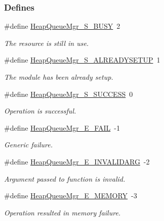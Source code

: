\subsubsection*{Defines}
\begin{DoxyCompactItemize}
\item 
\#define \hyperlink{_heap_queue_mgr_8h_a8c8548b774b12881b04ad5605794fe74}{HeapQueueMgr\_\-S\_\-BUSY}~2
\begin{DoxyCompactList}\small\item\em The resource is still in use. \item\end{DoxyCompactList}\item 
\#define \hyperlink{_heap_queue_mgr_8h_aa426084287fd3ff6fdbf269c462c1f67}{HeapQueueMgr\_\-S\_\-ALREADYSETUP}~1
\begin{DoxyCompactList}\small\item\em The module has been already setup. \item\end{DoxyCompactList}\item 
\#define \hyperlink{_heap_queue_mgr_8h_ae391285fa01b20f0bafde23b9f35e86b}{HeapQueueMgr\_\-S\_\-SUCCESS}~0
\begin{DoxyCompactList}\small\item\em Operation is successful. \item\end{DoxyCompactList}\item 
\#define \hyperlink{_heap_queue_mgr_8h_a6f142c013f3391abb45f411629099c33}{HeapQueueMgr\_\-E\_\-FAIL}~-\/1
\begin{DoxyCompactList}\small\item\em Generic failure. \item\end{DoxyCompactList}\item 
\#define \hyperlink{_heap_queue_mgr_8h_ac6cff9be3f3674d1b3a5103c8d398d9e}{HeapQueueMgr\_\-E\_\-INVALIDARG}~-\/2
\begin{DoxyCompactList}\small\item\em Argument passed to function is invalid. \item\end{DoxyCompactList}\item 
\#define \hyperlink{_heap_queue_mgr_8h_a072526eb43df0d3bd8bacf5fe555a29c}{HeapQueueMgr\_\-E\_\-MEMORY}~-\/3
\begin{DoxyCompactList}\small\item\em Operation resulted in memory failure. \item\end{DoxyCompactList}\item 

\end{DoxyCompactItemize}
